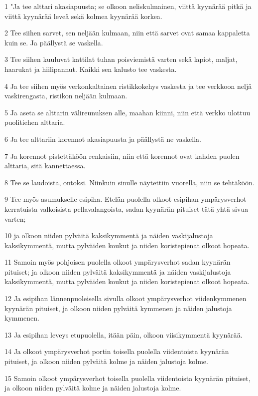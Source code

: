 \par 1 "Ja tee alttari akasiapuusta; se olkoon neliskulmainen, viittä kyynärää pitkä ja viittä kyynärää leveä sekä kolmea kyynärää korkea.
\par 2 Tee siihen sarvet, sen neljään kulmaan, niin että sarvet ovat samaa kappaletta kuin se. Ja päällystä se vaskella.
\par 3 Tee siihen kuuluvat kattilat tuhan poisviemistä varten sekä lapiot, maljat, haarukat ja hiilipannut. Kaikki sen kalusto tee vaskesta.
\par 4 Ja tee siihen myös verkonkaltainen ristikkokehys vaskesta ja tee verkkoon neljä vaskirengasta, ristikon neljään kulmaan.
\par 5 Ja aseta se alttarin välireunuksen alle, maahan kiinni, niin että verkko ulottuu puolitiehen alttaria.
\par 6 Ja tee alttariin korennot akasiapuusta ja päällystä ne vaskella.
\par 7 Ja korennot pistettäköön renkaisiin, niin että korennot ovat kahden puolen alttaria, sitä kannettaessa.
\par 8 Tee se laudoista, ontoksi. Niinkuin sinulle näytettiin vuorella, niin se tehtäköön.
\par 9 Tee myös asumukselle esipiha. Etelän puolella olkoot esipihan ympärysverhot kerratuista valkoisista pellavalangoista, sadan kyynärän pituiset tätä yhtä sivua varten;
\par 10 ja olkoon niiden pylväitä kaksikymmentä ja näiden vaskijalustoja kaksikymmentä, mutta pylväiden koukut ja niiden koristepienat olkoot hopeata.
\par 11 Samoin myös pohjoisen puolella olkoot ympärysverhot sadan kyynärän pituiset; ja olkoon niiden pylväitä kaksikymmentä ja näiden vaskijalustoja kaksikymmentä, mutta pylväiden koukut ja niiden koristepienat olkoot hopeata.
\par 12 Ja esipihan lännenpuoleisella sivulla olkoot ympärysverhot viidenkymmenen kyynärän pituiset, ja olkoon niiden pylväitä kymmenen ja näiden jalustoja kymmenen.
\par 13 Ja esipihan leveys etupuolella, itään päin, olkoon viisikymmentä kyynärää.
\par 14 Ja olkoot ympärysverhot portin toisella puolella viidentoista kyynärän pituiset, ja olkoon niiden pylväitä kolme ja näiden jalustoja kolme.
\par 15 Samoin olkoot ympärysverhot toisella puolella viidentoista kyynärän pituiset, ja olkoon niiden pylväitä kolme ja näiden jalustoja kolme.
